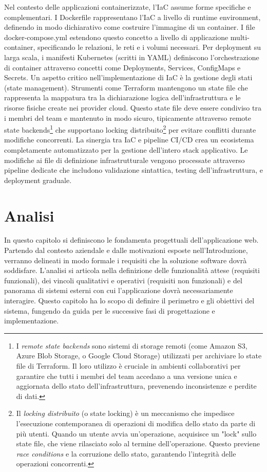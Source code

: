 \documentclass[12pt,a4paper,openright,twoside]{book}
\begin{document}
Nel contesto delle applicazioni containerizzate, l'IaC assume forme specifiche e complementari. I Dockerfile rappresentano l'IaC a livello di runtime environment, definendo in modo dichiarativo come costruire l'immagine di un container. I file docker-compose.yml estendono questo concetto a livello di applicazione multi-container, specificando le relazioni, le reti e i volumi necessari. Per deployment su larga scala, i manifesti Kubernetes (scritti in YAML) definiscono l'orchestrazione di container attraverso concetti come Deployments, Services, ConfigMaps e Secrets.
Un aspetto critico nell'implementazione di IaC è la gestione degli stati (state management). Strumenti come Terraform mantengono un state file che rappresenta la mappatura tra la dichiarazione logica dell'infrastruttura e le risorse fisiche create nei provider cloud. Questo state file deve essere condiviso tra i membri del team e mantenuto in modo sicuro, tipicamente attraverso remote state backends\footnote{I \textit{remote state backends} sono sistemi di storage remoti (come Amazon S3, Azure Blob Storage, o Google Cloud Storage) utilizzati per archiviare lo state file di Terraform. Il loro utilizzo è cruciale in ambienti collaborativi per garantire che tutti i membri del team accedano a una versione unica e aggiornata dello stato dell'infrastruttura, prevenendo inconsistenze e perdite di dati.} che supportano locking distribuito\footnote{Il \textit{locking distribuito} (o state locking) è un meccanismo che impedisce l'esecuzione contemporanea di operazioni di modifica dello stato da parte di più utenti. Quando un utente avvia un'operazione, acquisisce un "lock" sullo state file, che viene rilasciato solo al termine dell'operazione. Questo previene \textit{race conditions} e la corruzione dello stato, garantendo l'integrità delle operazioni concorrenti.} per evitare conflitti durante modifiche concorrenti.
La sinergia tra IaC e pipeline CI/CD crea un ecosistema completamente automatizzato per la gestione dell'intero stack applicativo. Le modifiche ai file di definizione infrastrutturale vengono processate attraverso pipeline dedicate che includono validazione sintattica, testing dell'infrastruttura, e deployment graduale.



\chapter{Analisi}
\label{chap:analisi}

In questo capitolo si definiscono le fondamenta progettuali dell'applicazione web. Partendo dal contesto aziendale e dalle motivazioni esposte nell'Introduzione, verranno delineati in modo formale i requisiti che la soluzione software dovrà soddisfare. L'analisi si articola nella definizione delle funzionalità attese (requisiti funzionali), dei vincoli qualitativi e operativi (requisiti non funzionali) e del panorama di sistemi esterni con cui l'applicazione dovrà necessariamente interagire. Questo capitolo ha lo scopo di definire il perimetro e gli obiettivi del sistema, fungendo da guida per le successive fasi di progettazione e implementazione.
\end{document}
